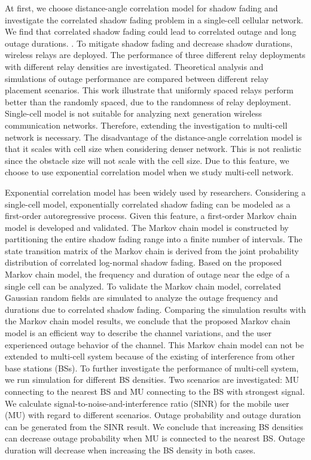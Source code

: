\par At first, we choose distance-angle correlation model for shadow fading and investigate the correlated shadow fading problem in a single-cell cellular network. We find that correlated shadow fading could lead to correlated outage and long outage durations. . To mitigate shadow fading and decrease shadow durations, wireless relays are deployed. The performance of three different relay deployments with different relay densities are investigated. Theoretical analysis and simulations of outage performance are compared between different relay placement scenarios. This work illustrate that uniformly spaced relays perform better than the randomly spaced, due to the randomness of relay deployment. Single-cell model is not suitable for analyzing next generation wireless communication networks. Therefore, extending the investigation to multi-cell network is necessary. The disadvantage of the distance-angle correlation model is that it scales with cell size when considering denser network. This is not realistic since the obstacle size will not scale with the cell size. Due to this feature, we choose to use exponential correlation model when we study multi-cell network. 
\par Exponential correlation model has been widely used by researchers. Considering a single-cell model, exponentially correlated shadow fading can be modeled as a first-order autoregressive process. Given this feature, a first-order Markov chain model is developed and validated. The Markov chain model is constructed by partitioning the entire shadow fading range into a finite number of intervals. The state transition matrix of the Markov chain is derived from the joint probability distribution of correlated log-normal shadow fading. Based on the proposed Markov chain model, the frequency and duration of outage near the edge of a single cell can be analyzed. To validate the Markov chain model, correlated Gaussian random fields are simulated to analyze the outage frequency and durations due to correlated shadow fading. Comparing the simulation results with the Markov chain model results, we conclude that the proposed Markov chain model is an efficient way to describe the channel variations, and the user experienced outage behavior of the channel. This Markov chain model can not be extended to multi-cell system because of the existing of interference from other base stations (BSs). To further investigate the performance of multi-cell system, we run simulation for different BS densities. Two scenarios are investigated: MU connecting to the nearest BS and MU connecting to the BS with strongest signal. We calculate signal-to-noise-and-interference ratio (SINR) for the mobile user (MU) with regard to different scenarios. Outage probability and outage duration can be generated from the SINR result. We conclude that increasing BS densities can decrease outage probability when MU is connected to the nearest BS. Outage duration will decrease when increasing the BS density in both cases. 

